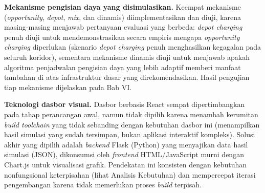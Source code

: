 \textbf{Mekanisme pengisian daya yang disimulasikan.} Keempat mekanisme
(\textit{opportunity}, \textit{depot}, \textit{mix}, dan dinamis)
diimplementasikan dan diuji, karena masing-masing menjawab pertanyaan
evaluasi yang berbeda: \textit{depot charging} penuh diuji untuk
mendemonstrasikan secara empiris mengapa \textit{opportunity charging}
diperlukan (skenario \textit{depot charging} penuh menghasilkan kegagalan
pada seluruh koridor), sementara mekanisme dinamis diuji untuk menjawab
apakah algoritma penjadwalan pengisian daya yang lebih adaptif memberi
manfaat tambahan di atas infrastruktur dasar yang direkomendasikan. Hasil
pengujian tiap mekanisme dijelaskan pada Bab VI.

\textbf{Teknologi dasbor visual.} Dasbor berbasis React sempat
dipertimbangkan pada tahap perancangan awal, namun tidak dipilih karena
menambah kerumitan \textit{build toolchain} yang tidak sebanding dengan
kebutuhan dasbor ini (menampilkan hasil simulasi yang sudah tersimpan,
bukan aplikasi interaktif kompleks). Solusi akhir yang dipilih adalah
\textit{backend} Flask (Python) yang menyajikan data hasil simulasi (JSON),
dikonsumsi oleh \textit{frontend} HTML/JavaScript murni dengan Chart.js
untuk visualisasi grafik. Pendekatan ini konsisten dengan kebutuhan
nonfungsional keterpisahan (lihat Analisis Kebutuhan) dan mempercepat
iterasi pengembangan karena tidak memerlukan proses \textit{build} terpisah.